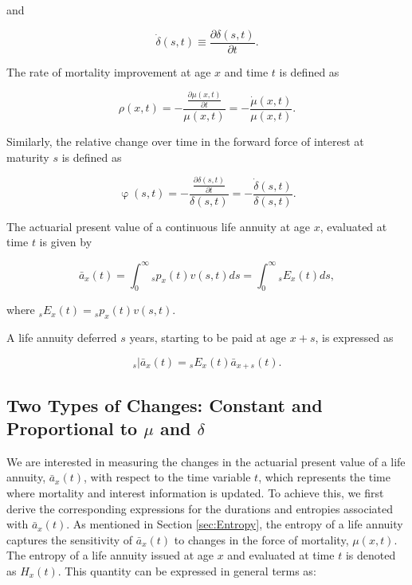 \documentclass[12pt]{article}
\begin{document}
and 

\begin{equation} \label{eq:deltadot}
\dot{\delta}(s,t)\equiv\frac{\partial\delta(s,t)}{\partial t}.
\end{equation}

The rate of mortality improvement at age \(x\) and time $t$ is defined as

\begin{equation} \label{eq:rho}
\rho(x,t)=-\frac{\frac{\partial \mu(x,t)}{\partial t}}{\mu(x,t)} = - \frac{\dot{\mu}(x,t)}{\mu(x,t)}.
\end{equation}

Similarly, the relative change over time in the forward force of interest at maturity $s$ is defined as 

\begin{equation} \label{eq:phi}
\upvarphi(s,t)=-\frac{\frac{\partial \delta(s,t)}{\partial t}}{\delta(s,t)} = -\frac{\dot{\delta}(s,t)}{\delta(s,t)}.
\end{equation}

The actuarial present value of a continuous life annuity at age $x$, evaluated at time $t$ is given by

\begin{equation}\label{eq:Annuity}
\bar{a}_x(t) = \int_0^\infty {}_sp_x(t) {v}(s,t)ds = \int_0^\infty {}_sE_x(t) ds,
\end{equation}

where ${}_sE_x(t)={}_sp_x(t) {v}(s,t)$. 

A life annuity deferred $s$ years, starting to be paid at age $x+s$, is expressed as

\begin{equation}\label{eq:DefAnnuity}
{}_s|\bar{a}_x(t) = {}_sE_x(t) \bar{a}_{x+s}(t).
\end{equation}


\subsection{Two Types of Changes: Constant and Proportional to $\mu$ and $\delta$}


We are interested in measuring the changes in the actuarial present value of a life annuity, \( \bar{a}_x(t) \), with respect to the time variable \( t \), which represents the time where mortality and interest information is updated. To achieve this, we first derive the corresponding expressions for the durations and entropies associated with \( \bar{a}_x(t) \). As mentioned in Section \ref{sec:Entropy}, the entropy of a life annuity captures the sensitivity of \( \bar{a}_x(t) \) to changes in the force of mortality, \( \mu(x,t) \). The entropy of a life annuity issued at age \( x \) and evaluated at time \( t \) is denoted as \( H_x(t) \). This quantity can be expressed in general terms as:
\end{document}
